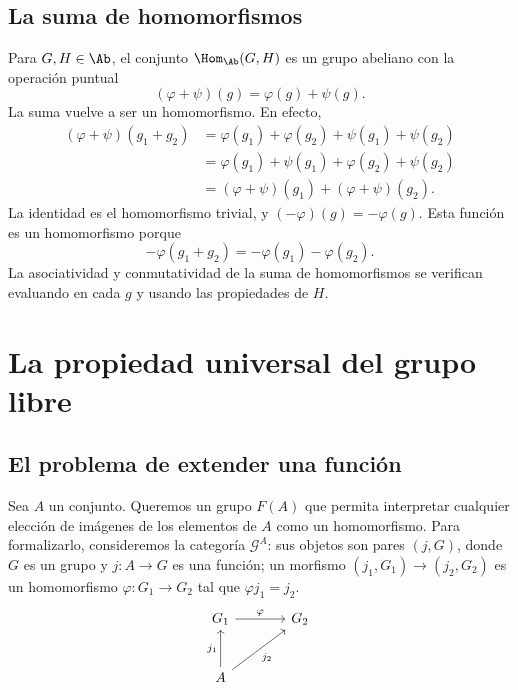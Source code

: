 \subsection{La suma de homomorfismos}
Para $G,H\in\Ab$, el conjunto $\Hom_{\Ab}(G,H)$ es un grupo abeliano con la operación puntual
\[
(\varphi+\psi)(g)=\varphi(g)+\psi(g).
\]
La suma vuelve a ser un homomorfismo. En efecto,
\[
\begin{aligned}
(\varphi+\psi)(g_1+g_2)
&=\varphi(g_1)+\varphi(g_2)+\psi(g_1)+\psi(g_2)\\
&=\varphi(g_1)+\psi(g_1)+\varphi(g_2)+\psi(g_2)\\
&=(\varphi+\psi)(g_1)+(\varphi+\psi)(g_2).
\end{aligned}
\]
La identidad es el homomorfismo trivial, y $(-\varphi)(g)=-\varphi(g)$. Esta función es un homomorfismo porque
\[
-\varphi(g_1+g_2)=-\varphi(g_1)-\varphi(g_2).
\]
La asociatividad y conmutatividad de la suma de homomorfismos se verifican evaluando en cada $g$ y usando las propiedades de $H$.

\section{La propiedad universal del grupo libre}
\subsection{El problema de extender una función}
Sea $A$ un conjunto. Queremos un grupo $F(A)$ que permita interpretar cualquier elección de imágenes de los elementos de $A$ como un homomorfismo. Para formalizarlo, consideremos la categoría $\mathcal G^A$: sus objetos son pares $(j,G)$, donde $G$ es un grupo y $j:A\to G$ es una función; un morfismo $(j_1,G_1)\to(j_2,G_2)$ es un homomorfismo $\varphi:G_1\to G_2$ tal que $\varphi j_1=j_2$.
\[
\begin{tikzcd}[column sep=large,row sep=large]
G_1\arrow[r,"\varphi"]&G_2\\
A\arrow[u,"j_1"]\arrow[ur,"j_2"']&
\end{tikzcd}
\]

